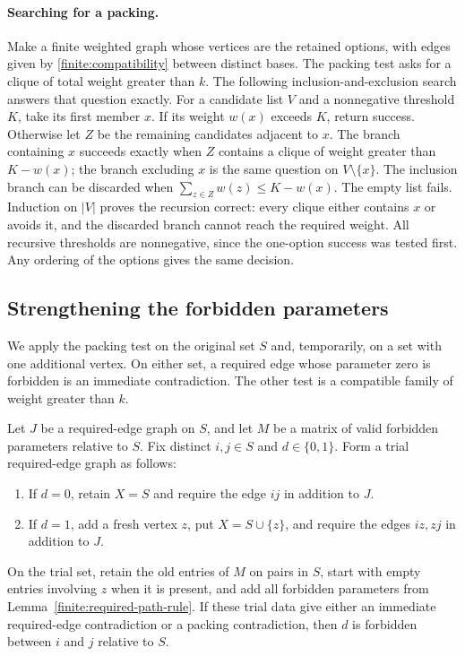 \paragraph{Searching for a packing.}
Make a finite weighted graph whose vertices are the retained options,
with edges given by \eqref{finite:compatibility} between distinct bases.
The packing test asks for a clique of total weight greater than $k$.
The following inclusion-and-exclusion search answers that question
exactly.  For a candidate list $V$ and a nonnegative threshold $K$,
take its first member $x$.  If its weight $w(x)$ exceeds $K$, return
success.  Otherwise let $Z$ be the remaining candidates adjacent to
$x$.  The branch containing $x$ succeeds exactly when $Z$ contains a
clique of weight greater than $K-w(x)$; the branch excluding $x$ is
the same question on $V\setminus\{x\}$.
The inclusion branch can be discarded when
$\sum_{z\in Z}w(z)\le K-w(x)$.
The empty list fails.  Induction on $|V|$ proves the recursion correct:
every clique either contains $x$ or avoids it, and the discarded branch
cannot reach the required weight.  All recursive thresholds are
nonnegative, since the one-option success was tested first.
Any ordering of the options gives the same decision.

\subsection{Strengthening the forbidden parameters}
\label{finite:strengthening-subsection}

We apply the packing test on the original set $S$ and, temporarily,
on a set with one additional vertex.  On either set, a required edge
whose parameter zero is forbidden is an immediate contradiction.
The other test is a compatible family of weight greater than $k$.

\begin{lemma}\label{finite:strengthening}
Let $J$ be a required-edge graph on $S$, and let $M$ be a matrix of
valid forbidden parameters relative to $S$.
Fix distinct $i,j\in S$ and $d\in\{0,1\}$.
Form a trial required-edge graph as follows:
\begin{enumerate}
\item If $d=0$, retain $X=S$ and require the edge $ij$ in addition to $J$.
\item If $d=1$, add a fresh vertex $z$, put $X=S\cup\{z\}$, and require
the edges $iz,zj$ in addition to $J$.
\end{enumerate}
On the trial set, retain the old entries of $M$ on pairs in $S$,
start with empty entries involving $z$ when it is present, and add all
forbidden parameters from Lemma~\ref{finite:required-path-rule}.
If these trial data give either an immediate required-edge
contradiction or a packing contradiction, then $d$ is forbidden
between $i$ and $j$ relative to $S$.
\end{lemma}

